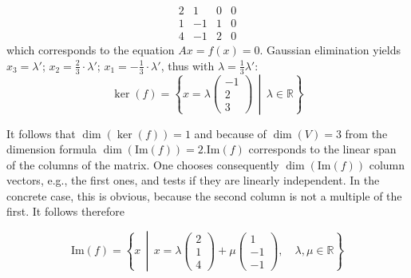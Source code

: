 \[
\begin{array}{cccc}
2 & 1 & 0 & 0 \\
1 & -1 & 1 & 0 \\
4 & -1 & 2 & 0
\end{array}
\]
which corresponds to the equation \(Ax = f(x) = 0\). Gaussian 
elimination yields \(x_3 = \lambda'\); 
\(x_2 = \frac{2}{3} \cdot \lambda'\); \(x_1 = -\frac{1}{3} \cdot \lambda'\), 
thus with \(\lambda = \frac{1}{3} \lambda'\):
\[
\ker(f) =
\left\{
x = \lambda
\begin{pmatrix}
-1 \\
2 \\
3
\end{pmatrix}
\, \middle| \, \lambda \in \mathbb{R}
\right\}
\]

It follows that \(\dim(\ker(f)) = 1\) and because of \(\dim(V) = 3\) from the dimension 
formula \(\dim(\text{Im}(f)) = 2\).\(\text{Im}(f)\) corresponds to the linear 
span of the columns of the matrix. One chooses consequently \(\dim(\text{Im}(f))\) 
column vectors, e.g., the first ones, and tests if they are linearly independent. 
In the concrete case, this is obvious, because the second column is 
not a multiple of the first. It follows therefore

\[
\text{Im}(f) =
\left\{
x \, \middle| \, x = \lambda
\begin{pmatrix}
2 \\
1 \\
4
\end{pmatrix} + \mu
\begin{pmatrix}
1 \\
-1 \\
-1
\end{pmatrix}
, \quad \lambda, \mu \in \mathbb{R}
\right\}
\]

